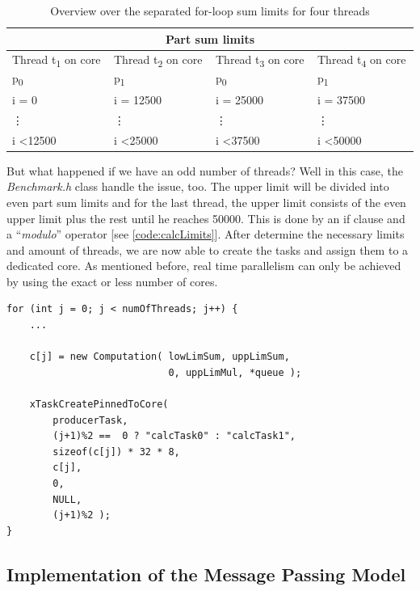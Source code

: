 \renewcommand{\arraystretch}{1.5}

\begin{table}[h!]
	\centering
	\begin{tabular}{ | m{3cm} | m{3cm} | m{3cm} | m{3cm} |  }
		\hline
		\multicolumn{4}{|c|}{Part sum limits} \\
		\hline
		Thread t\textsubscript{1} on core p\textsubscript{0} & 
		Thread t\textsubscript{2} on core p\textsubscript{1} &
		Thread t\textsubscript{3} on core p\textsubscript{0} &
		Thread t\textsubscript{4} on core p\textsubscript{1} \\
		\hline
		i = 0 & i = 12500 & i = 25000 & i = 37500 \\
		\vdots & \vdots & \vdots & \vdots \\
		i \textless 12500 & i \textless 25000 & i \textless 37500 & i \textless 50000 \\
		\hline
	\end{tabular}
	\caption{ Overview over the separated for-loop sum limits for four threads }
	\label{table:partSumLimits}
\end{table}

But what happened if we have an odd number of threads? Well in this case, the \textit{Benchmark.h} class handle the issue, too. The upper limit will be divided into even part sum limits and for the last thread, the upper limit consists of the even upper limit plus the rest until he reaches 50000. This is done by an if clause and a ``\textit{modulo}'' operator [see \ref{code:calcLimits}]. After determine the necessary limits and amount of threads, we are now able to create the tasks and assign them to a dedicated core. As mentioned before, real time parallelism can only be achieved by using the exact or less number of cores. 

\begin{lstlisting}[label={code:createThreads}]
for (int j = 0; j < numOfThreads; j++) {
	...
	
	c[j] = new Computation(	lowLimSum, uppLimSum, 
							0, uppLimMul, *queue );
	
	xTaskCreatePinnedToCore(
		producerTask,
		(j+1)%2 ==  0 ? "calcTask0" : "calcTask1",
		sizeof(c[j]) * 32 * 8,
		c[j],
		0,
		NULL,
		(j+1)%2 );
}
\end{lstlisting}  

\newpage

\subsection{Implementation of the Message Passing Model}

